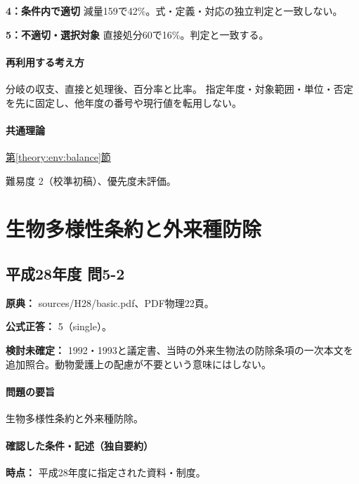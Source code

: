 \noindent\textbf{4：条件内で適切} 減量159で42\%。式・定義・対応の独立判定と一致しない。\par

\noindent\textbf{5：不適切・選択対象} 直接処分60で16\%。判定と一致する。\par

\paragraph{再利用する考え方} 分岐の収支、直接と処理後、百分率と比率。 指定年度・対象範囲・単位・否定を先に固定し、他年度の番号や現行値を転用しない。

\paragraph{共通理論} \hyperref[theory:env:balance]{第\ref*{theory:env:balance}節}

\par 難易度 2（校準初稿）、優先度未評価。

\section{生物多様性条約と外来種防除}

\subsection{平成28年度 問5-2}
\label{q:h28-reg-basic-5-2}

\noindent\textbf{原典：} sources/H28/basic.pdf、PDF物理22頁。

\textbf{公式正答：} 5（single）。

\par\textbf{検討未確定：} 1992・1993と議定書、当時の外来生物法の防除条項の一次本文を追加照合。動物愛護上の配慮が不要という意味にはしない。

\paragraph{問題の要旨} 生物多様性条約と外来種防除。

\paragraph{確認した条件・記述（独自要約）}\mbox{}\par

\noindent\textbf{時点：} 平成28年度に指定された資料・制度。\par

